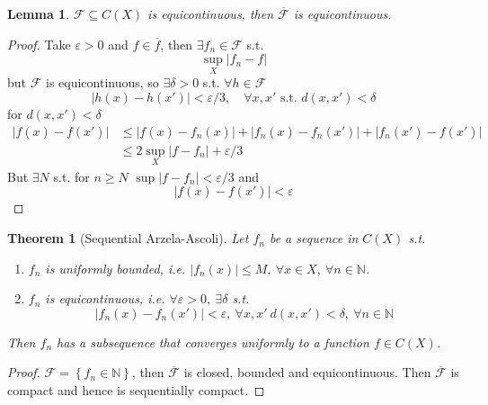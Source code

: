\documentclass[11pt,a4paper]{article}
\theoremstyle{definition}
\theoremstyle{plain}
\newtheorem{theorem}[definition]{Theorem}
\newtheorem{lemma}[definition]{Lemma}
\theoremstyle{remark}
\newcommand{\N}{\mathbb{N}}
\renewcommand{\set}[1]{\left\{ #1 \right\}}
\newcommand{\abs}[1]{\lvert #1 \rvert}
\newcommand{\1}{\mathbbm{1}}
\begin{document}
\begin{lemma}
    $\mathcal{F} \subseteq C(X)$ is equicontinuous, then $\overline{\mathcal{F}}$ is equicontinuous.
\end{lemma}

\begin{proof}
    Take $\varepsilon > 0$ and $f \in \overline{f}$, then $\exists f_n \in \mathcal{F}$ s.t. 
    $$\sup_{X} \abs{f_n - f}$$
    but $\mathcal{F}$ is equicontinuous, so $\exists \delta > 0$ s.t. $\forall h \in \mathcal{F}$
    $$\abs{h(x) - h(x')} < \varepsilon/3, \quad \forall x, x' \text{ s.t. } d(x,x') < \delta$$
    for $d(x,x') < \delta$ 
    \begin{align*}
        \abs{f(x) - f(x')} &\le \abs{f(x) - f_n(x)} + \abs{f_n(x) - f_n(x')} + \abs{f_n(x') - f(x')} \\
        &\le 2 \sup_X \abs{f - f_n} + \varepsilon/3 
    \end{align*}
    But $\exists N$ s.t. for $n \ge N$ $\sup \abs{f - f_n} < \varepsilon/3$ and 
    $$\abs{f(x) - f(x')} < \varepsilon$$
\end{proof}

\begin{theorem}[Sequential Arzela-Ascoli]
    Let $f_n$ be a sequence in $C(X)$ s.t. 
    \begin{enumerate}[label = \roman*)]
        \item $f_n$ is uniformly bounded, i.e. $\abs{f_n(x)} \le M, \ \forall x \in X, \ \forall n \in \N$. 
        \item $f_n$ is equicontinuous, i.e. $\forall \varepsilon > 0, \ \exists \delta$ s.t. 
        $$\abs{f_n(x) - f_n(x')} < \varepsilon, \ \forall x, x' \ d(x,x') < \delta, \ \forall n \in \N$$
    \end{enumerate}
    Then $f_n$ has a subsequence that converges uniformly to a function $f \in C(X)$.
\end{theorem}

\begin{proof}
    $\mathcal{F} = \set{f_n \in \N}$, then $\overline{\mathcal{F}}$ is closed, bounded and equicontinuous. 
    Then $\overline{\mathcal{F}}$ is compact and hence is sequentially compact.
\end{proof}
\end{document}

